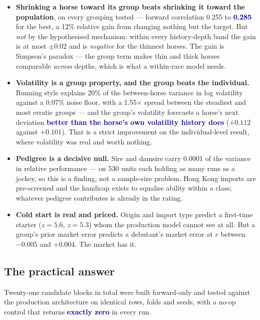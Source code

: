 \documentclass[11pt,a4paper]{article}
\newcommand{\good}[1]{\textcolor{darkblue}{\textbf{#1}}}
\begin{document}
\begin{itemize}\itemsep2pt
\item \textbf{Shrinking a horse toward its group beats shrinking it toward the
population}, on every grouping tested --- forward correlation 0.255 to \good{0.285}
for the best, a 12\% relative gain from changing nothing but the target. But
\emph{not} by the hypothesised mechanism: within every history-depth band the gain
is at most $\pm0.02$ and is \emph{negative} for the thinnest horses. The gain is
Simpson's paradox --- the group term makes thin and thick horses comparable
\emph{across} depths, which is what a within-race model needs.

\item \textbf{Volatility is a group property, and the group beats the individual.}
Running style explains 20\% of the between-horse variance in log volatility against
a 0.07\% noise floor, with a 1.55$\times$ spread between the steadiest and most
erratic groups --- and the group's volatility forecasts a horse's next deviation
\good{better than the horse's own volatility history does} ($+0.112$ against
$+0.101$). That is a strict improvement on the individual-level result, where
volatility was real and worth nothing.

\item \textbf{Pedigree is a decisive null.} Sire and damsire carry 0.0001 of the
variance in relative performance --- on 530 units each holding as many runs as a
jockey, so this is a finding, not a sample-size problem. Hong Kong imports are
pre-screened and the handicap exists to equalise ability within a class; whatever
pedigree contributes is already in the rating.

\item \textbf{Cold start is real and priced.} Origin and import type predict a
first-time starter ($z=5.6$, $z=5.3$) whom the production model cannot see at all.
But a group's prior market error predicts a debutant's market error at $r$ between
$-0.005$ and $+0.004$. The market has it.
\end{itemize}

\subsection*{The practical answer}

Twenty-one candidate blocks in total were built forward-only and tested against the
production architecture on identical rows, folds and seeds, with a no-op control
that returns \good{exactly zero} in every run.
\end{document}
